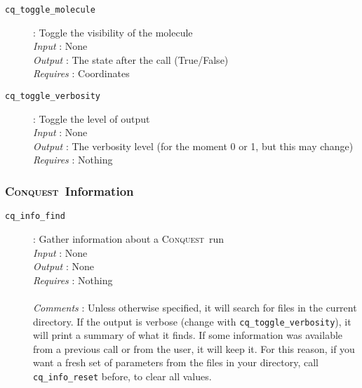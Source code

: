 \documentclass[a4paper,notitlepage,11pt]{article}
\def\CQ{\textsc{Conquest}}
\begin{document}
\begin{description}
\item[\texttt{cq\_toggle\_molecule}]: Toggle the visibility of the molecule\\
  \emph{Input} : None\\
  \emph{Output} : The state after the call (True/False)\\
  \emph{Requires} : Coordinates\\
\end{description}

\begin{description}
\item[\texttt{cq\_toggle\_verbosity}]: Toggle the level of output\\
  \emph{Input} : None\\
  \emph{Output} : The verbosity level (for the moment 0 or 1, but this may change)\\
  \emph{Requires} : Nothing\\
\end{description}

\subsubsection{\CQ\ Information}
\label{sec:py-function-cqinfo}
\index{\CQ\ Information}

\begin{description}
\item[\texttt{cq\_info\_find}]: Gather information about a \CQ\ run\\
  \emph{Input} : None\\
  \emph{Output} : None\\
  \emph{Requires} : Nothing\\
  \\
  \emph{Comments} : Unless otherwise specified, it will search for files in the current directory.
  If the output is verbose (change with \texttt{cq\_toggle\_verbosity}), it will print a summary
  of what it finds. If some information was available from a previous call or from the user, it will keep it.
  For this reason, if you want a fresh set of parameters from the files in your directory, call \texttt{cq\_info\_reset}
  before, to clear all values.
\end{description}
\end{document}

